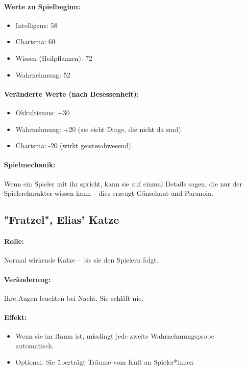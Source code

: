 \paragraph{Werte zu Spielbeginn:}
\begin{itemize}
\item Intelligenz: 58
\item Charisma: 60
\item Wissen (Heilpflanzen): 72
\item Wahrnehmung: 52
\end{itemize}
\paragraph{Veränderte Werte (nach Besessenheit):}
\begin{itemize}
\item Okkultismus: +30
\item Wahrnehmung: +20 (sie sieht Dinge, die nicht da sind)
\item Charisma: -20 (wirkt geistesabwesend)
\end{itemize}
\paragraph{Spielmechanik:}
Wenn ein Spieler mit ihr spricht, kann sie auf einmal Details sagen, die nur der Spielercharakter wissen kann – dies erzeugt Gänsehaut und Paranoia.

\newpage
\subsection{"Fratzel", Elias’ Katze}
\paragraph{Rolle:} Normal wirkende Katze – bis sie den Spielern folgt.
\paragraph{Veränderung:} Ihre Augen leuchten bei Nacht. Sie schläft nie.
\paragraph{Effekt:}
\begin{itemize}
\item Wenn sie im Raum ist, misslingt jede zweite Wahrnehmungsprobe automatisch.
\item Optional: Sie überträgt Träume vom Kult an Spieler*innen
\end{itemize}
